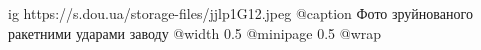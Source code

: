  
 
 
 
 

\ifcmt
  ig https://s.dou.ua/storage-files/jjlp1G12.jpeg
  @caption Фото зруйнованого ракетними ударами заводу
  @width 0.5
  @minipage 0.5
  @wrap \parpic[r]
\fi
